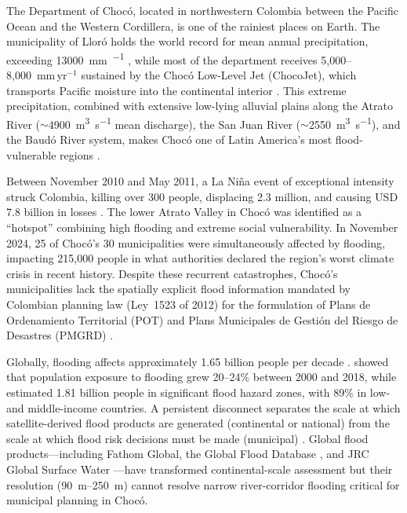 \documentclass{article}
\begin{document}
The Department of Choc\'o, located in northwestern Colombia between the Pacific Ocean and the Western Cordillera, is one of the rainiest places on Earth. The municipality of Llor\'o holds the world record for mean annual precipitation, exceeding \SI{13000}{\milli\metre\per\year} \citep{PovedaMesa2000}, while most of the department receives 5,000--8,000~mm\,yr$^{-1}$ sustained by the Choc\'o Low-Level Jet (ChocoJet), which transports Pacific moisture into the continental interior \citep{Poveda2023, CHOCOJEX2019, Gallego2021}. This extreme precipitation, combined with extensive low-lying alluvial plains along the Atrato River ($\sim$\SI{4900}{\cubic\metre\per\second} mean discharge), the San Juan River ($\sim$\SI{2550}{\cubic\metre\per\second}), and the Baud\'o River system, makes Choc\'o one of Latin America's most flood-vulnerable regions \citep{FloodRiskLAC2022}.

Between November 2010 and May 2011, a La Ni\~na event of exceptional intensity struck Colombia, killing over 300 people, displacing 2.3 million, and causing USD 7.8 billion in losses \citep{Hoyos2013}. The lower Atrato Valley in Choc\'o was identified as a ``hotspot'' combining high flooding and extreme social vulnerability. In November 2024, 25 of Choc\'o's 30 municipalities were simultaneously affected by flooding, impacting 215,000 people in what authorities declared the region's worst climate crisis in recent history. Despite these recurrent catastrophes, Choc\'o's municipalities lack the spatially explicit flood information mandated by Colombian planning law (Ley~1523 of 2012) for the formulation of Plans de Ordenamiento Territorial (POT) and Plans Municipales de Gesti\'on del Riesgo de Desastres (PMGRD) \citep{CongresoCol2012, OECD2019}.

Globally, flooding affects approximately 1.65 billion people per decade \citep{UNDRR2020}. \citet{Tellman2021} showed that population exposure to flooding grew 20--24\% between 2000 and 2018, while \citet{Rentschler2022} estimated 1.81 billion people in significant flood hazard zones, with 89\% in low- and middle-income countries. A persistent disconnect separates the scale at which satellite-derived flood products are generated (continental or national) from the scale at which flood risk decisions must be made (municipal) \citep{Bates2023}. Global flood products---including Fathom Global, the Global Flood Database \citep{Tellman2021}, and JRC Global Surface Water \citep{Pekel2016}---have transformed continental-scale assessment but their resolution (\SI{90}{\metre}--\SI{250}{\metre}) cannot resolve narrow river-corridor flooding critical for municipal planning in Choc\'o.
\end{document}
